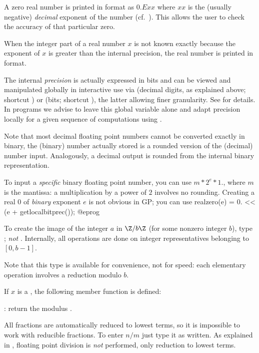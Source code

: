  A zero real number is printed in 
format as $0.Exx$ where $xx$ is the (usually negative) \emph{decimal}
exponent of the number (cf.~). This allows the user to
check the accuracy of that particular zero.

When the integer part of a real number $x$ is not known exactly because the
exponent of $x$ is greater than the internal precision, the real number is
printed in  format.

 The internal \emph{precision} is actually
expressed in bits and can be viewed and manipulated globally in interactive
use via  (decimal digits, as explained above; shortcut
) or  (bits; shortcut ), the
latter allowing finer granularity. See  for details. In
programs we advise to leave this global variable alone and adapt precision
locally for a given sequence of computations using .

Note that most decimal floating point numbers cannot be converted exactly
in binary, the (binary) number actually stored is a rounded version of the
(decimal) number input. Analogously, a decimal output is rounded
from the internal binary representation.

To input a \emph{specific} binary floating point number, you can use $m * 2^e
* 1.$, where $m$ is the mantissa: a multiplication by a power of $2$ involves
no rounding. Creating a real $0$ of \emph{binary} exponent $e$ is not obvious
in GP; you can use
\bprog
  realzero(e) = 0. << (e + getlocalbitprec());
@eprog

%
To create the image of the integer $a$ in $\Z/b\Z$ (for some nonzero
integer $b$), type ; \emph{not} .
Internally, all operations are done on integer representatives belonging to
$[0,b-1]$.

Note that this type is available for convenience, not for speed: each
elementary operation involves a reduction modulo $b$.

If $x$ is a  , the following member function is
defined:

: return the modulus .

%
All fractions are automatically reduced to lowest
terms, so it is impossible to work with reducible fractions. To enter $n/m$
just type it as written. As explained in , floating point
division is \emph{not} performed, only reduction to lowest
terms.\label{se:FRAC}


